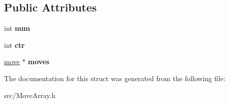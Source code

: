\subsection*{Public Attributes}
\begin{DoxyCompactItemize}
\item 
\mbox{\label{structmoveArray_a5613065aad1d00414461f416c6b4b724}} 
int {\bfseries num}
\item 
\mbox{\label{structmoveArray_a9dbadb0980be9c133d9587c8572a1c49}} 
int {\bfseries ctr}
\item 
\mbox{\label{structmoveArray_a6f6b1dbbae6cdaea0e321c58a8a1d4ce}} 
\hyperlink{structmove}{move} $\ast$ {\bfseries moves}
\end{DoxyCompactItemize}


The documentation for this struct was generated from the following file\+:\begin{DoxyCompactItemize}
\item 
src/Move\+Array.\+h\end{DoxyCompactItemize}

